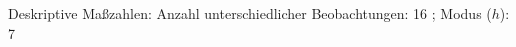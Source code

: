 				\label{tableValues:cjob0525b}
				\vspace*{-\baselineskip}
                    \begin{noten}
                	    \note{} Deskriptive Maßzahlen:
                	    Anzahl unterschiedlicher Beobachtungen: 16%
                	    ; 
                	      Modus ($h$): 7
                     \end{noten}

